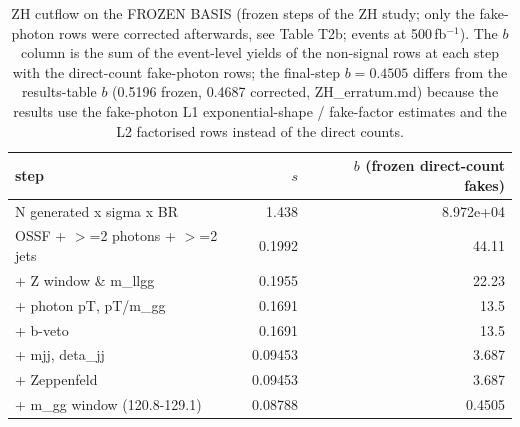 \begin{table}[ht]\centering\small
\begin{tabular}{lrr}\hline
step & $s$ & $b$ (frozen direct-count fakes) \\\hline
N generated x sigma x BR & 1.438 & 8.972e+04 \\
OSSF + $>$=2 photons + $>$=2 jets & 0.1992 & 44.11 \\
+ Z window \& m\_llgg & 0.1955 & 22.23 \\
+ photon pT, pT/m\_gg & 0.1691 & 13.5 \\
+ b-veto & 0.1691 & 13.5 \\
+ mjj, deta\_jj & 0.09453 & 3.687 \\
+ Zeppenfeld & 0.09453 & 3.687 \\
+ m\_gg window (120.8-129.1) & 0.08788 & 0.4505 \\\hline
\end{tabular}
\caption{ZH cutflow on the FROZEN BASIS (frozen steps of the ZH study; only the fake-photon rows were corrected afterwards, see Table T2b; events at 500\,fb$^{-1}$). The $b$ column is the sum of the event-level yields of the non-signal rows at each step with the direct-count fake-photon rows; the final-step $b=0.4505$ differs from the results-table $b$ (0.5196 frozen, 0.4687 corrected, ZH\_erratum.md) because the results use the fake-photon L1 exponential-shape / fake-factor estimates and the L2 factorised rows instead of the direct counts.}
\end{table}
